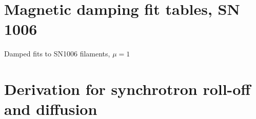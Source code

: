 \documentclass[iop, apj, numberedappendix]{emulateapj}
\begin{document}
\clearpage
\section{Magnetic damping fit tables, SN 1006}

\begin{table*}[ht]
    \scriptsize
    \centering
    \caption{Damped fits to SN1006 filaments, $\mu = 1$}
    
\end{table*}

\clearpage
\section{Derivation for synchrotron roll-off and diffusion}

\end{document}
